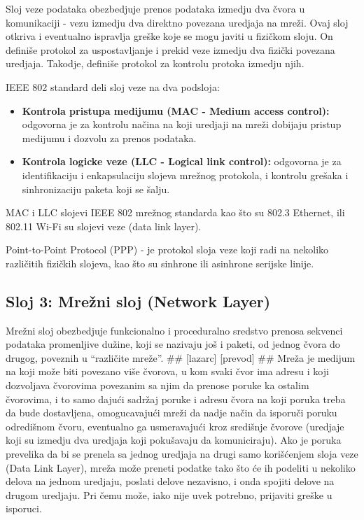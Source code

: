 \documentclass[a4paper,12pt, master]{etf}
\begin{document}
	Sloj veze podataka obezbedjuje prenos podataka izmedju dva \v{c}vora u komunikaciji - vezu
	izmedju dva direktno povezana uredjaja na mre\v{z}i. Ovaj sloj otkriva i eventualno ispravlja
	gre\v{s}ke koje se mogu javiti u fizi\v{c}kom sloju. On defini\v{s}e protokol za uspostavljanje i
	prekid veze izmedju dva fizi\v{c}ki povezana uredjaja. Takodje, defini\v{s}e protokol za kontrolu
	protoka izmedju njih.

	IEEE 802 standard deli sloj veze na dva podsloja:
	\begin{itemize}
		\item \textbf{Kontrola pristupa medijumu (MAC - Medium access control):}
		odgovorna je za kontrolu na\v{c}ina na koji uredjaji na mre\v{z}i dobijaju pristup medijumu i
		dozvolu za prenos podataka.
		\item \textbf{Kontrola logicke veze (LLC - Logical link control):}
		odgovorna je za identifikaciju i enkapsulaciju slojeva mre\v{z}nog protokola, i kontrolu
		gre\v{s}aka i sinhronizaciju paketa koji se \v{s}alju.
	\end{itemize}

	MAC i LLC slojevi IEEE 802 mre\v{z}nog standarda kao \v{s}to su 802.3 Ethernet, ili 802.11 Wi-Fi su
	slojevi veze (data link layer).

	Point-to-Point Protocol (PPP) - je protokol sloja veze koji radi na nekoliko razli\v{c}itih
	fizi\v{c}kih slojeva, kao \v{s}to su sinhrone ili asinhrone serijske linije.

	\subsection{Sloj 3: Mre\v{z}ni sloj (Network Layer)}

	Mre\v{z}ni sloj obezbedjuje funkcionalno i proceduralno sredstvo prenosa sekvenci podataka
	promenljive du\v{z}ine, koji se nazivaju jo\v{s} i paketi, od jednog \v{c}vora do drugog, poveznih u
        ``razli\v{c}ite mre\v{z}e''. \#\# [lazarc] [prevod] \#\# Mre\v{z}a je medijum na koji mo\v{z}e biti
        povezano vi\v{s}e \v{c}vorova, u kom svaki \v{c}vor ima adresu i koji dozvoljava \v{c}vorovima povezanim
        sa njim da prenose poruke ka ostalim \v{c}vorovima, i to samo daju\'{c}i sadr\v{z}aj poruke i adresu
        \v{c}vora na koji poruka treba da bude dostavljena, omogucavaju\'{c}i mre\v{z}i da nadje na\v{c}in da
        isporu\v{c}i poruku odredi\v{s}nom \v{c}voru, eventualno ga usmeravaju\'{c}i kroz sredi\v{s}nje
        \v{c}vorove (uredjaje koji su izmedju dva uredjaja koji poku\v{s}avaju da komuniciraju). Ako je poruka
        prevelika da bi se prenela sa jednog uredjaja na drugi samo kori\v{s}\'{c}enjem sloja veze (Data Link
        Layer), mre\v{z}a mo\v{z}e preneti podatke tako \v{s}to \'{c}e ih podeliti u nekoliko delova na jednom
        uredjaju, poslati delove nezavisno, i onda spojiti delove na drugom uredjaju. Pri \v{c}emu mo\v{z}e, iako
        nije uvek potrebno, prijaviti gre\v{s}ke u isporuci.
\end{document}
